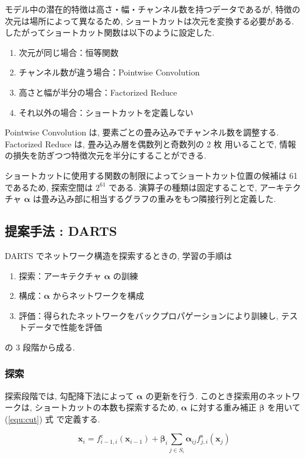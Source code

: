 モデル中の潜在的特徴は高さ・幅・チャンネル数を持つデータであるが,
特徴の次元は場所によって異なるため, ショートカットは次元を変換する必要がある.
したがってショートカット関数は以下のように設定した.
\begin{enumerate}
  \item 次元が同じ場合：恒等関数
  \item チャンネル数が違う場合：Pointwise Convolution
  \item 高さと幅が半分の場合：Factorized Reduce
  \item それ以外の場合：ショートカットを定義しない
\end{enumerate}
Pointwise Convolution は, 要素ごとの畳み込みでチャンネル数を調整する.
Factorized Reduce は, 畳み込み層を偶数列と奇数列の 2 枚 用いることで, 情報の損失を防ぎつつ特徴次元を半分にすることができる.

ショートカットに使用する関数の制限によってショートカット位置の候補は 61 であるため,
探索空間は $2^{61}$ である.
演算子の種類は固定することで, アーキテクチャ $\bm{\alpha}$ は畳み込み部に相当するグラフの重みをもつ隣接行列と定義した.


\changeindent{0cm}
\subsection{提案手法 : DARTS}
\label{sec:pred.01}
\changeindent{2cm}

DARTS でネットワーク構造を探索するときの, 学習の手順は
\begin{enumerate}
  \item 探索：アーキテクチャ $\bm{\alpha}$ の訓練
  \item 構成：$\bm{\alpha}$ からネットワークを構成
  \item 評価：得られたネットワークをバックプロパゲーションにより訓練し, テストデータで性能を評価
\end{enumerate}
の 3 段階から成る.


\subsubsection{探索}

探索段階では, 勾配降下法によって $\bm{\alpha}$ の更新を行う.
このとき探索用のネットワークは, ショートカットの本数も探索するため,
$\bm{\alpha}$ に対する重み補正 $\bm{\beta}$ を用いて (\ref{equ:cut}) 式 で定義する.

\begin{equation}
  \label{equ:cut}
  \bm{x}_i = f^{\mathrm{c}}_{i-1, i}(\bm{x}_{i-1}) + \bm{\beta}_i \sum_{j \in S_i} \bm{\alpha}_{ij} f^{\mathrm{s}}_{j, i} (\bm{x}_j)
\end{equation}

